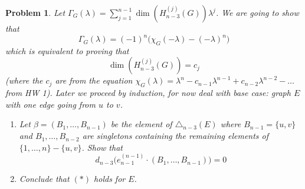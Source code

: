 \documentclass{article}
\theoremstyle{normal}
\newtheorem{problem}{Problem}
\theoremstyle{thmit}
\begin{document}
\begin{problem}
    Let $\Gamma_G(\lambda)=\sum_{j=1}^{n-1}\dim(H_{n-3}^{(j)}(G))\lambda^j$. 
    \newline
    We are going to show that
    \begin{equation}
        \Gamma_G(\lambda)=(-1)^n\big(\chi_G(-\lambda)-(-\lambda)^n\big)\tag{*}
    \end{equation}
    which is equivalent to proving that 
    \begin{equation}
        \dim (H_{n-3}^{(j)}(G))=c_j
    \end{equation}
    (where the $c_j$ are from the equation
    $\chi_G(\lambda)=\lambda^n - c_{n-1}\lambda^{n-1} + c_{n-2}\lambda^{n-2}-\dots$ from HW 1).
    Later we proceed by induction, for now deal with base case: graph $E$ with one edge going
    from $u$ to $v$. 
    \begin{enumerate}[label = (\alph*)]
        \item
            Let $\beta = (B_1, \dots, B_{n-1})$ be the element of $\triangle_{n-3}(E)$ where
            $B_{n-1}=\{u,v\}$ and $B_1, \dots, B_{n-2}$ are singletons containing the remaining
            elements of $\{1,\dots, n\} - \{u,v\}$. Show that
            \begin{equation}
                d_{n-3}\Big(e_{n-1}^{(n-1)}\cdot(B_1,\dots,B_{n-1})\Big)=0
            \end{equation}
        \item Conclude that $(*)$ holds for $E$. 
    \end{enumerate}
\end{problem}
\end{document}
